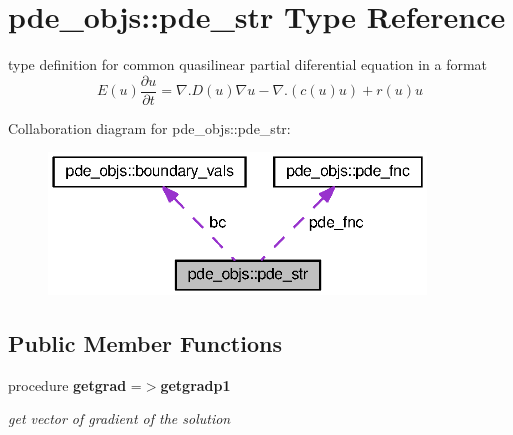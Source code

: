 \section{pde\+\_\+objs\+:\+:pde\+\_\+str Type Reference}
\label{structpde__objs_1_1pde__str}


type definition for common quasilinear partial diferential equation in a format \[ E(u)\frac{\partial u}{\partial t} = \nabla . D(u) \nabla u - \nabla . (c(u) u) + r(u) u \]  




Collaboration diagram for pde\+\_\+objs\+:\+:pde\+\_\+str\+:\nopagebreak
\begin{figure}[H]
\begin{center}
\leavevmode
\includegraphics[width=284pt]{structpde__objs_1_1pde__str__coll__graph}
\end{center}
\end{figure}
\subsection*{Public Member Functions}
\begin{DoxyCompactItemize}
\item 
procedure {\bf getgrad} =$>${\bf getgradp1}
\begin{DoxyCompactList}\small\item\em get vector of gradient of the solution \end{DoxyCompactList}\end{DoxyCompactItemize}
